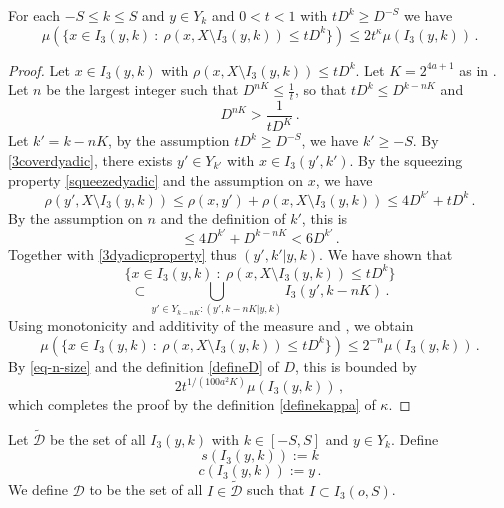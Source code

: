 \begin{lemma}
    \label{boundary-measure}
    For each $-S\le k\le S$ and $y\in Y_k$ and $0<t<1$
    with $tD^k\ge D^{-S}$ we have
    \begin{equation}
        \label{old-small-boundary}
        \mu(\{x \in I_3(y,k) \ : \ \rho(x, X \setminus I_3(y,k)) \leq t D^{k}\}) \le 2 t^\kappa \mu(I_3(y,k))\,.
    \end{equation}
\end{lemma}
\begin{proof}
Let $x\in I_3(y,k)$ with $\rho(x, X \setminus I_3(y,k)) \leq t D^{k}$. Let $K = 2^{4a+1}$ as in .
Let $n$ be the largest integer such that
$D^{nK} \le \frac{1}{t}$, so that $tD^k \le D^{k-nK}$ and
\begin{equation}
\label{eq-n-size}
    D^{nK} > \frac{1}{tD^K}\,.
\end{equation}
Let $k' = k - nK$, by the assumption $tD^k \ge D^{-S}$, we have $k' \ge -S$. By \eqref{3coverdyadic}, there exists $y' \in Y_{k'}$ with $x \in I_3(y',k')$. By the squeezing property \eqref{squeezedyadic} and the assumption on $x$, we have
$$
    \rho(y', X \setminus I_3(y,k)) \le \rho(x,y') + \rho(x, X \setminus I_3(y,k)) \le 4 D^{k'} + t D^{k}\,.
$$
By the assumption on $n$ and the definition of $k'$, this is
$$
    \le 4D^{k'} + D^{k - nK} < 6D^{k'}\,.
$$
Together with \eqref{3dyadicproperty} thus $(y',k'|y,k)$. We have shown that
$$
    \{x \in I_3(y,k) \ : \ \rho(x, X \setminus I_3(y,k)) \leq t D^{k}\}
$$
$$
    \subset \bigcup_{y'\in Y_{k-nK}: (y',k-nK|y,k)}I_3(y',k-nK)\,.
$$
Using monotonicity and additivity of the measure and , we obtain
$$
    \mu(\{x \in I_3(y,k) \ : \ \rho(x, X \setminus I_3(y,k)) \leq t D^{k}\}) \le 2^{-n} \mu(I_3(y,k))\,.
$$
By \eqref{eq-n-size} and the definition \eqref{defineD} of $D$, this is bounded by
$$
    2 t^{1/(100a^2 K)}  \mu(I_3(y,k))\,,
$$
which completes the proof by the definition \eqref{definekappa} of $\kappa$.
\end{proof}

Let $\tilde{\mathcal{D}}$ be the set of all $I_3(y,k)$ with $k\in [-S,S]$ and
$y\in Y_k$. Define
\begin{equation}
s(I_3(y,k)):=k
\end{equation}
\begin{equation}
c(I_3(y,k)):=y\,.
\end{equation}
We define $\mathcal{D}$ to be the set of all $I \in \tilde{\mathcal{D}}$ such that $I \subset I_3(o, S)$.

